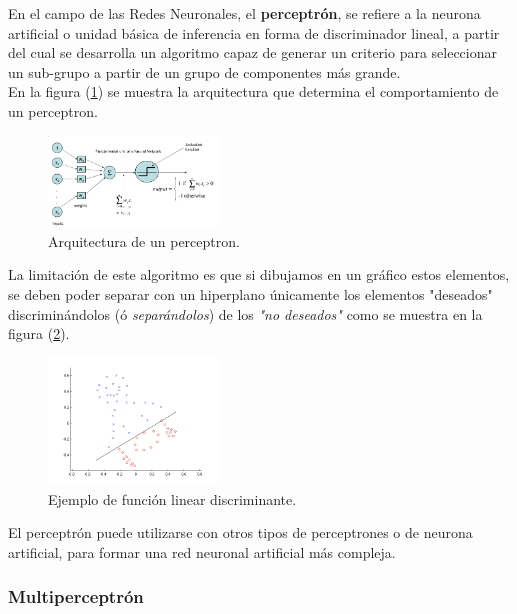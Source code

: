 \documentclass[osajnl,twocolumn,showpacs,superscriptaddress,10pt,floatfix]{revtex4-1} %
\begin{document}
En el campo de las Redes Neuronales, el \textbf{perceptrón}, se refiere a la neurona artificial o unidad básica de inferencia en forma de discriminador lineal, a partir del cual se desarrolla un algoritmo capaz de generar un criterio para seleccionar un sub-grupo a partir de un grupo de componentes más grande. \\

En la figura (\ref{figure:perceptron_example}) se muestra la arquitectura que determina el comportamiento de un perceptron.

\begin{figure}[H]
    \centering
    \includegraphics[width=0.4\textwidth]{theory/perceptron}
    \caption{Arquitectura de un perceptron.}
    \label{figure:perceptron_example}
\end{figure}

La limitación de este algoritmo es que si dibujamos en un gráfico estos elementos, se deben poder separar con un hiperplano únicamente los elementos "deseados" discriminándolos (ó \textit{separándolos}) de los \textit{"no deseados"} como se muestra en la figura (\ref{figure:linear_example}).

\begin{figure}[H]
    \centering
    \includegraphics[width=0.4\textwidth]{theory/linear}
    \caption{Ejemplo de función linear discriminante.}
    \label{figure:linear_example}
\end{figure}

El perceptrón puede utilizarse con otros tipos de perceptrones o de neurona artificial, para formar una red neuronal artificial más compleja.

\subsubsection{Multiperceptrón}
\end{document}
